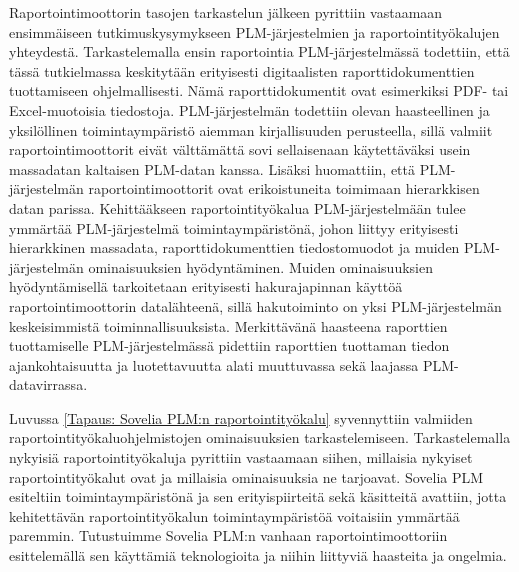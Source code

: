 Raportointimoottorin tasojen tarkastelun jälkeen pyrittiin vastaamaan ensimmäiseen tutkimuskysymykseen PLM-järjestelmien ja raportointityökalujen yhteydestä. Tarkastelemalla ensin raportointia PLM-järjestelmässä todettiin, että tässä tutkielmassa keskitytään erityisesti digitaalisten raporttidokumenttien tuottamiseen ohjelmallisesti. Nämä raporttidokumentit ovat esimerkiksi PDF- tai Excel-muotoisia tiedostoja. PLM-järjestelmän todettiin olevan haasteellinen ja yksilöllinen toimintaympäristö aiemman kirjallisuuden perusteella, sillä valmiit raportointimoottorit eivät välttämättä sovi sellaisenaan käytettäväksi usein massadatan kaltaisen PLM-datan kanssa. \cite{rohleder_requirements_2014} Lisäksi huomattiin, että PLM-järjestelmän raportointimoottorit ovat erikoistuneita toimimaan hierarkkisen datan parissa. \cite{rohleder_requirements_2014} Kehittääkseen raportointityökalua PLM-järjestelmään tulee ymmärtää PLM-järjestelmä toimintaympäristönä, johon liittyy erityisesti hierarkkinen massadata, raporttidokumenttien tiedostomuodot ja muiden PLM-järjestelmän ominaisuuksien hyödyntäminen. Muiden ominaisuuksien hyödyntämisellä tarkoitetaan erityisesti hakurajapinnan käyttöä raportointimoottorin datalähteenä, sillä hakutoiminto on yksi PLM-järjestelmän keskeisimmistä toiminnallisuuksista. \cite{enriquez_approach_2019} Merkittävänä haasteena raporttien tuottamiselle PLM-järjestelmässä pidettiin raporttien tuottaman tiedon ajankohtaisuutta ja luotettavuutta alati muuttuvassa sekä laajassa PLM-datavirrassa. \cite{german_challenge_2016} 

Luvussa \ref{Tapaus: Sovelia PLM:n raportointityökalu} syvennyttiin valmiiden raportointityökaluohjelmistojen ominaisuuksien tarkastelemiseen. Tarkastelemalla nykyisiä raportointityökaluja pyrittiin vastaamaan siihen, millaisia nykyiset raportointityökalut ovat ja millaisia ominaisuuksia ne tarjoavat. Sovelia PLM esiteltiin toimintaympäristönä ja sen erityispiirteitä sekä käsitteitä avattiin, jotta kehitettävän raportointityökalun toimintaympäristöä voitaisiin ymmärtää paremmin. Tutustuimme Sovelia PLM:n vanhaan raportointimoottoriin esittelemällä sen käyttämiä teknologioita ja niihin liittyviä haasteita ja ongelmia.

